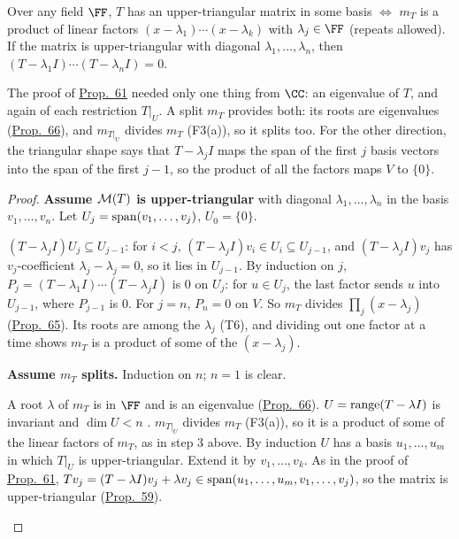 \documentclass[10pt]{scrartcl}
\begin{document}
\begin{proposition*}\hypertarget{name-triangular-iff-split}{}\label{name-triangular-iff-split}
  Over any field $\FF$, $T$ has an upper-triangular matrix in some basis $\iff$ $m_T$ is a product of linear factors $(x-\lambda_1)\cdots(x-\lambda_k)$ with $\lambda_j\in\FF$ (repeats allowed). If the matrix is upper-triangular with diagonal $\lambda_1,\dots,\lambda_n$, then $(T-\lambda_1I)\cdots(T-\lambda_nI)=0$.
\end{proposition*}
\begin{ideabox}
The proof of \hyperref[prop-61]{Prop.~61} needed only one thing from $\CC$: an eigenvalue of $T$, and again of each restriction $T|_U$. A split $m_T$ provides both: its roots are eigenvalues (\hyperref[prop-66]{Prop.~66}), and $m_{T|_U}$ divides $m_T$ (F3(a)), so it splits too. For the other direction, the triangular shape says that $T-\lambda_jI$ maps the span of the first $j$ basis vectors into the span of the first $j-1$, so the product of all the factors maps $V$ to $\{0\}$.
\end{ideabox}
\begin{proof}
  \textbf{Assume $\mathcal M(T)$ is upper-triangular} with diagonal $\lambda_1,\dots,\lambda_n$ in the basis $v_1,\dots,v_n$. Let $U_j=\operatorname{span}(v_1,\dots,v_j)$, $U_0=\{0\}$.
  \begin{steps}
    \ii $(T-\lambda_jI)U_j\subseteq U_{j-1}$: for $i<j$, $(T-\lambda_jI)v_i\in U_i\subseteq U_{j-1}$, and $(T-\lambda_jI)v_j$ has $v_j$-coefficient $\lambda_j-\lambda_j=0$, so it lies in $U_{j-1}$.
    \ii By induction on $j$, $P_j=(T-\lambda_1I)\cdots(T-\lambda_jI)$ is $0$ on $U_j$: for $u\in U_j$, the last factor sends $u$ into $U_{j-1}$, where $P_{j-1}$ is $0$. For $j=n$, $P_n=0$ on $V$.
    \ii So $m_T$ divides $\prod_j(x-\lambda_j)$ (\hyperref[prop-65]{Prop.~65}). Its roots are among the $\lambda_j$ (T6), and dividing out one factor at a time shows $m_T$ is a product of some of the $(x-\lambda_j)$.
  \end{steps}
  \textbf{Assume $m_T$ splits.} Induction on $n$; $n=1$ is clear.
  \begin{steps}
    \ii A root $\lambda$ of $m_T$ is in $\FF$ and is an eigenvalue (\hyperref[prop-66]{Prop.~66}). $U=\operatorname{range}(T-\lambda I)$ is invariant  and $\dim U<n$ .
    \ii $m_{T|_U}$ divides $m_T$ (F3(a)), so it is a product of some of the linear factors of $m_T$, as in step 3 above. By induction $U$ has a basis $u_1,\dots,u_m$ in which $T|_U$ is upper-triangular.
    \ii Extend it by $v_1,\dots,v_k$. As in the proof of \hyperref[prop-61]{Prop.~61}, $Tv_j=(T-\lambda I)v_j+\lambda v_j\in\operatorname{span}(u_1,\dots,u_m,v_1,\dots,v_j)$, so the matrix is upper-triangular (\hyperref[prop-59]{Prop.~59}).
  \end{steps}
\end{proof}
\end{document}
